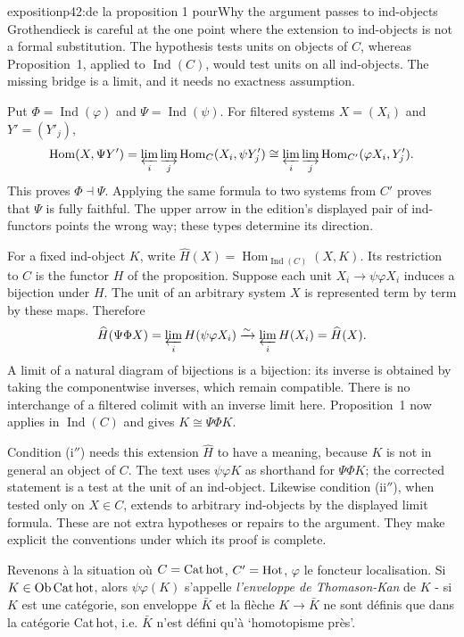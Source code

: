 \begin{dcomment}{exposition}{p42:de la proposition 1 pour}{Why the argument passes to ind-objects}
Grothendieck is careful at the one point where the extension to ind-objects is not a formal substitution. The hypothesis tests units on objects of $C$, whereas Proposition~1, applied to $\operatorname{Ind}(C)$, would test units on all ind-objects. The missing bridge is a limit, and it needs no exactness assumption.

Put $\Phi=\operatorname{Ind}(\varphi)$ and $\Psi=\operatorname{Ind}(\psi)$. For filtered systems $X=(X_i)$ and $Y'=(Y'_j)$,
\[
 \operatorname{Hom}(X,\Psi Y')
  =\varprojlim_i\varinjlim_j\operatorname{Hom}_C(X_i,\psi Y'_j)
  \cong\varprojlim_i\varinjlim_j
        \operatorname{Hom}_{C'}(\varphi X_i,Y'_j).
\]
This proves $\Phi\dashv\Psi$. Applying the same formula to two systems from $C'$ proves that $\Psi$ is fully faithful. The upper arrow in the edition's displayed pair of ind-functors points the wrong way; these types determine its direction.

For a fixed ind-object $K$, write $\widehat H(X)=\operatorname{Hom}_{\operatorname{Ind}(C)}(X,K)$. Its restriction to $C$ is the functor $H$ of the proposition. Suppose each unit $X_i\to\psi\varphi X_i$ induces a bijection under $H$. The unit of an arbitrary system $X$ is represented term by term by these maps. Therefore
\[
 \widehat H(\Psi\Phi X)=\varprojlim_i H(\psi\varphi X_i)
   \xrightarrow{\sim}\varprojlim_i H(X_i)=\widehat H(X).
\]
A limit of a natural diagram of bijections is a bijection: its inverse is obtained by taking the componentwise inverses, which remain compatible. There is no interchange of a filtered colimit with an inverse limit here. Proposition~1 now applies in $\operatorname{Ind}(C)$ and gives $K\cong\Psi\Phi K$.

Condition (i$''$) needs this extension $\widehat H$ to have a meaning, because $K$ is not in general an object of $C$. The text uses $\psi\varphi K$ as shorthand for $\Psi\Phi K$; the corrected statement is a test at the unit of an ind-object. Likewise condition (ii$''$), when tested only on $X\in C$, extends to arbitrary ind-objects by the displayed limit formula. These are not extra hypotheses or repairs to the argument. They make explicit the conventions under which its proof is complete.
\end{dcomment}


Revenons à la situation où $C = \mathrm{Cat\,hot}$, $C' = \mathrm{Hot}$, $\varphi$ le foncteur localisation. Si $K \in \mathrm{Ob}\,\mathrm{Cat\,hot}$, alors $\psi\varphi(K)$ s'appelle \textit{l'enveloppe de Thomason-Kan} de $K$ - si $K$ est une catégorie, son enveloppe $\bar{K}$ et la flèche $K \longrightarrow \bar{K}$ ne sont définis que dans la catégorie Cat\,hot, i.e. $\bar{K}$ n'est défini qu'à `homotopisme près'. %

